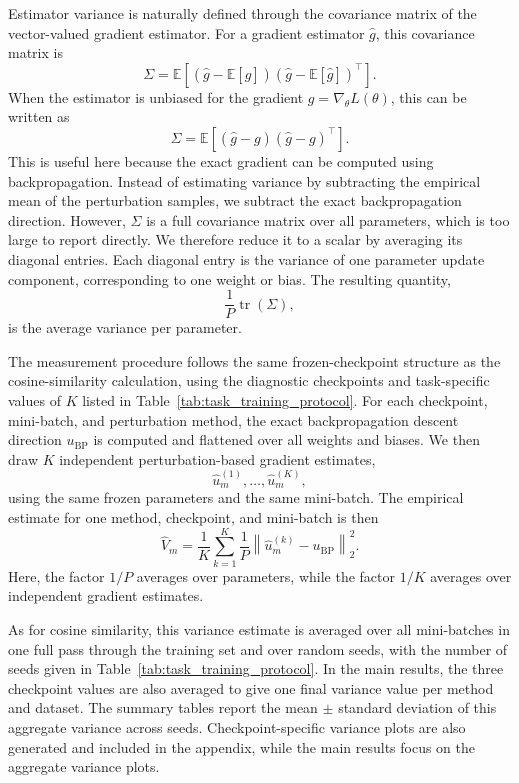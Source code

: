 Estimator variance is naturally defined through the covariance matrix of the vector-valued gradient estimator. For a gradient estimator \(\widehat{g}\), this covariance matrix is
\[
    \Sigma
    =
    \mathbb{E}\!\left[
    (\widehat{g}-\mathbb{E}[\widehat{g}])
    (\widehat{g}-\mathbb{E}[\widehat{g}])^\top
    \right].
\]
When the estimator is unbiased for the gradient \(g=\nabla_\theta L(\theta)\), this can be written as
\[
    \Sigma
    =
    \mathbb{E}\!\left[
    (\widehat{g}-g)
    (\widehat{g}-g)^\top
    \right].
\]
This is useful here because the exact gradient can be computed using backpropagation. Instead of estimating variance by subtracting the empirical mean of the perturbation samples, we subtract the exact backpropagation direction. However, \(\Sigma\) is a full covariance matrix over all parameters, which is too large to report directly. We therefore reduce it to a scalar by averaging its diagonal entries. Each diagonal entry is the variance of one parameter update component, corresponding to one weight or bias. The resulting quantity,
\[
    \frac{1}{P}\operatorname{tr}(\Sigma),
\]
is the average variance per parameter.

The measurement procedure follows the same frozen-checkpoint structure as the cosine-similarity calculation, using the diagnostic checkpoints and task-specific values of \(K\) listed in Table~\ref{tab:task_training_protocol}. For each checkpoint, mini-batch, and perturbation method, the exact backpropagation descent direction \(u_{\mathrm{BP}}\) is computed and flattened over all weights and biases. We then draw \(K\) independent perturbation-based gradient estimates,
\[
    \widehat{u}^{(1)}_m,\ldots,\widehat{u}^{(K)}_m,
\]
using the same frozen parameters and the same mini-batch. The empirical estimate for one method, checkpoint, and mini-batch is then
\[
    \widehat{V}_m
    =
    \frac{1}{K}
    \sum_{k=1}^{K}
    \frac{1}{P}
    \left\|
    \widehat{u}^{(k)}_m - u_{\mathrm{BP}}
    \right\|_2^2 .
\]
Here, the factor \(1/P\) averages over parameters, while the factor \(1/K\) averages over independent gradient estimates.

As for cosine similarity, this variance estimate is averaged over all mini-batches in one full pass through the training set and over random seeds, with the number of seeds given in Table~\ref{tab:task_training_protocol}. In the main results, the three checkpoint values are also averaged to give one final variance value per method and dataset. The summary tables report the mean \(\pm\) standard deviation of this aggregate variance across seeds. Checkpoint-specific variance plots are also generated and included in the appendix, while the main results focus on the aggregate variance plots.
